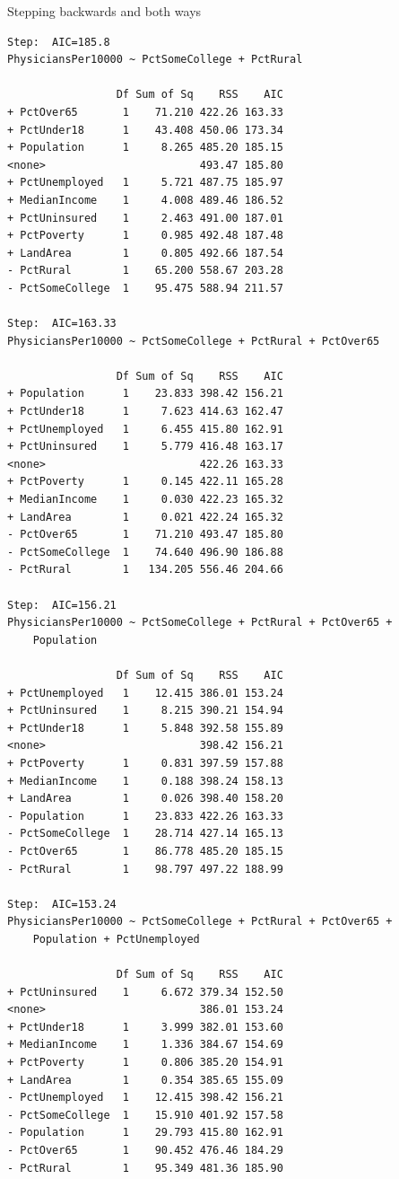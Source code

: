 \documentclass{beamer}\usepackage[]{graphicx}\usepackage[]{color}
\makeatletter
\newenvironment{kframe}{%
 \def\at@end@of@kframe{}%
 \ifinner\ifhmode%
  \def\at@end@of@kframe{\end{minipage}}%
  \begin{minipage}{\columnwidth}%
 \fi\fi%
 \def\FrameCommand##1{\hskip\@totalleftmargin \hskip-\fboxsep
 \colorbox{shadecolor}{##1}\hskip-\fboxsep
     \hskip-\linewidth \hskip-\@totalleftmargin \hskip\columnwidth}%
 \MakeFramed {\advance\hsize-\width
   \@totalleftmargin\z@ \linewidth\hsize
   \@setminipage}}%
 {\par\unskip\endMakeFramed%
 \at@end@of@kframe}
\newenvironment{knitrout}{}{} %
\makeatother
\begin{document}
\begin{darkframes}
\begin{frame}[fragile]{Stepping backwards and both ways}
\begin{knitrout}
\begin{kframe}
\begin{verbatim}
Step:  AIC=185.8
PhysiciansPer10000 ~ PctSomeCollege + PctRural

                 Df Sum of Sq    RSS    AIC
+ PctOver65       1    71.210 422.26 163.33
+ PctUnder18      1    43.408 450.06 173.34
+ Population      1     8.265 485.20 185.15
<none>                        493.47 185.80
+ PctUnemployed   1     5.721 487.75 185.97
+ MedianIncome    1     4.008 489.46 186.52
+ PctUninsured    1     2.463 491.00 187.01
+ PctPoverty      1     0.985 492.48 187.48
+ LandArea        1     0.805 492.66 187.54
- PctRural        1    65.200 558.67 203.28
- PctSomeCollege  1    95.475 588.94 211.57

Step:  AIC=163.33
PhysiciansPer10000 ~ PctSomeCollege + PctRural + PctOver65

                 Df Sum of Sq    RSS    AIC
+ Population      1    23.833 398.42 156.21
+ PctUnder18      1     7.623 414.63 162.47
+ PctUnemployed   1     6.455 415.80 162.91
+ PctUninsured    1     5.779 416.48 163.17
<none>                        422.26 163.33
+ PctPoverty      1     0.145 422.11 165.28
+ MedianIncome    1     0.030 422.23 165.32
+ LandArea        1     0.021 422.24 165.32
- PctOver65       1    71.210 493.47 185.80
- PctSomeCollege  1    74.640 496.90 186.88
- PctRural        1   134.205 556.46 204.66

Step:  AIC=156.21
PhysiciansPer10000 ~ PctSomeCollege + PctRural + PctOver65 + 
    Population

                 Df Sum of Sq    RSS    AIC
+ PctUnemployed   1    12.415 386.01 153.24
+ PctUninsured    1     8.215 390.21 154.94
+ PctUnder18      1     5.848 392.58 155.89
<none>                        398.42 156.21
+ PctPoverty      1     0.831 397.59 157.88
+ MedianIncome    1     0.188 398.24 158.13
+ LandArea        1     0.026 398.40 158.20
- Population      1    23.833 422.26 163.33
- PctSomeCollege  1    28.714 427.14 165.13
- PctOver65       1    86.778 485.20 185.15
- PctRural        1    98.797 497.22 188.99

Step:  AIC=153.24
PhysiciansPer10000 ~ PctSomeCollege + PctRural + PctOver65 + 
    Population + PctUnemployed

                 Df Sum of Sq    RSS    AIC
+ PctUninsured    1     6.672 379.34 152.50
<none>                        386.01 153.24
+ PctUnder18      1     3.999 382.01 153.60
+ MedianIncome    1     1.336 384.67 154.69
+ PctPoverty      1     0.806 385.20 154.91
+ LandArea        1     0.354 385.65 155.09
- PctUnemployed   1    12.415 398.42 156.21
- PctSomeCollege  1    15.910 401.92 157.58
- Population      1    29.793 415.80 162.91
- PctOver65       1    90.452 476.46 184.29
- PctRural        1    95.349 481.36 185.90


\end{verbatim}
\end{kframe}
\end{knitrout}
\end{frame}
\end{darkframes}
\end{document}

